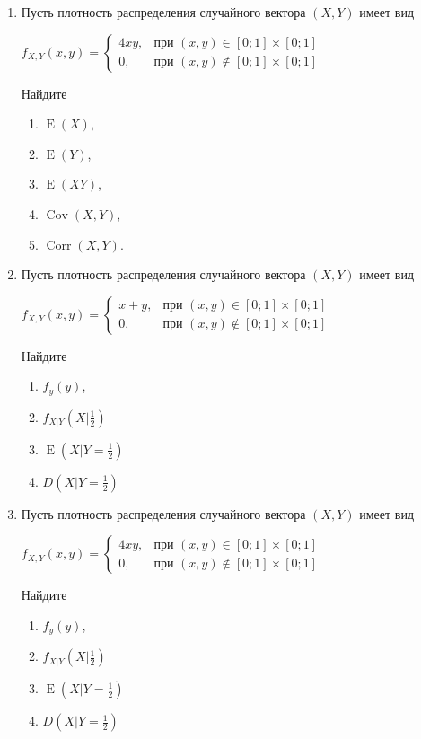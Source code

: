 \documentclass[12pt]{article}
\DeclareMathOperator{\Cov}{Cov}
\DeclareMathOperator{\Corr}{Corr}
\DeclareMathOperator{\E}{E}
\begin{document}
\begin{enumerate}
\item Пусть плотность распределения случайного вектора $(X,Y)$ имеет вид
\begin{center} $f_{X,Y}(x,y) = \begin{cases} 4xy, & \mbox{при } (x,y) \in [0;1] \times [0;1] \\ 0 , & \mbox{при } (x,y) \not\in [0;1] \times [0;1] \end{cases}$  \end{center}

Найдите  
\begin{enumerate}
\item $\E(X)$,  
\item $\E(Y)$,  
\item $\E(XY)$,  
\item $\Cov(X,Y)$,  
\item $\Corr(X,Y)$.  
\end{enumerate}

\item Пусть плотность распределения случайного вектора $(X,Y)$ имеет вид
\begin{center} $f_{X,Y}(x,y) = \begin{cases} x+y, & \mbox{при } (x,y) \in [0;1] \times [0;1] \\ 0 , & \mbox{при } (x,y) \not\in [0;1] \times [0;1] \end{cases}$  \end{center}

Найдите  
\begin{enumerate}
\item $f_{y}(y)$,  
\item $f_{X|Y}\left(X|\frac{1}{2}\right)$  
\item $\E\left(X|Y = \frac{1}{2}\right)$  
\item $D\left(X|Y = \frac{1}{2}\right)$  
\end{enumerate}

\item Пусть плотность распределения случайного вектора $(X,Y)$ имеет вид
\begin{center} $f_{X,Y}(x,y) = \begin{cases} 4xy, & \mbox{при } (x,y) \in [0;1] \times [0;1] \\ 0 , & \mbox{при } (x,y) \not\in [0;1] \times [0;1] \end{cases}$  \end{center}

Найдите  
\begin{enumerate}
\item $f_{y}(y)$,  
\item $f_{X|Y}\left(X|\frac{1}{2}\right)$  
\item $\E\left(X|Y = \frac{1}{2}\right)$  
\item $D\left(X|Y = \frac{1}{2}\right)$  
\end{enumerate}

\end{enumerate}
\end{document}
